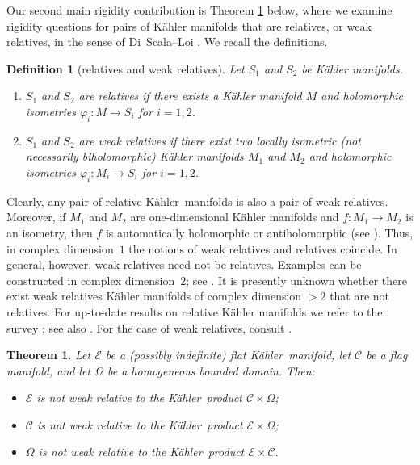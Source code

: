 \documentclass[reqno]{amsart}
\newcommand{\K}{K\"{a}hler}
\newtheorem{theor}{Theorem}[section]
\newtheorem{defin}{Definition}
\begin{document}
Our second main rigidity contribution is  Theorem \ref{mainteorrel} below, where  we examine rigidity questions for pairs of K\"ahler manifolds that are relatives, or weak relatives, in the sense of Di~Scala--Loi \cite{diloi}. We recall the definitions.
 
\begin{defin}[relatives and weak relatives]\label{defrel}
Let $S_1$ and $S_2$ be K\"ahler manifolds.
\begin{enumerate}[(1)]
  \item $S_1$ and $S_2$ are \emph{relatives} if there exists a K\"ahler manifold $M$
        and holomorphic isometries $\varphi_i \colon M \to S_i$ for $i=1,2$.
  \item $S_1$ and $S_2$ are \emph{weak relatives} if there exist
        two locally isometric (not necessarily biholomorphic) K\"ahler manifolds $M_1$ and $M_2$ 
        and holomorphic isometries $\varphi_i \colon M_i \to S_i$ for $i=1,2$.
\end{enumerate}
\end{defin}

Clearly, any pair of relative \K\ manifolds is also a pair of weak relatives.
Moreover, if $M_1$ and $M_2$ are one-dimensional K\"ahler manifolds and $f \colon M_1 \to M_2$ is an isometry, then $f$ is automatically holomorphic or anti\-holomorphic (see  \cite[Lemma 6]{Placini2023}). Thus, in complex dimension~$1$ the notions of weak relatives and relatives coincide.
In general, however, weak relatives need not be relatives. Examples can be constructed in complex dimension~$2$; see \cite{Placini2023}. It is presently unknown whether there exist weak relatives K\"ahler manifolds of complex dimension $>2$ that are not relatives.  For up-to-date results on relative K\"ahler manifolds we refer to the survey \cite{YUANYUAN}; see also \cite{ChengHaoYuanZhang2024,LMblowup}. For the case of weak relatives, consult \cite{diloi,Placini2023}.



\begin{theor}\label{mainteorrel}
Let $\mathcal E$ be a (possibly indefinite) flat \K\ manifold, let $\mathcal C$ be a flag manifold, and let $\Omega$ be a homogeneous bounded domain. Then:
\begin{itemize}
\item[(i)] $\mathcal E$ is not weak relative to the \K\ product $\mathcal C \times \Omega$;
  \item[(ii)] $\mathcal C$ is not weak relative to the \K\ product $\mathcal E \times \Omega$;
  \item[(iii)] $\Omega$ is not weak relative to the \K\ product $\mathcal E \times \mathcal C$.
\end{itemize}
\end{theor}
\end{document}
